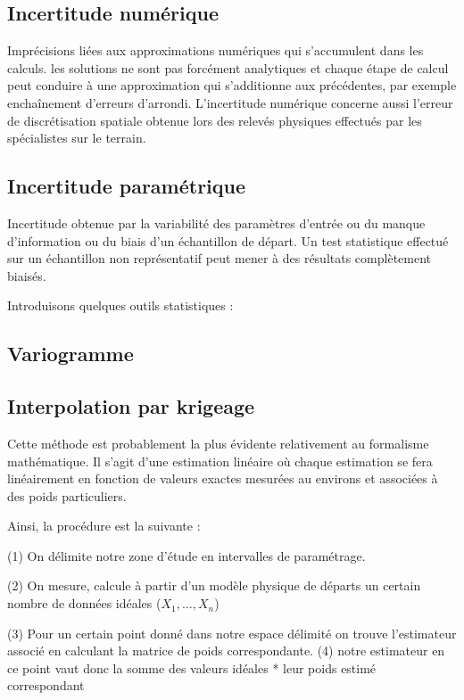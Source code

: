 \documentclass[hidelinks,12pt]{article}
\begin{document}
\subsection{Incertitude numérique}


Imprécisions liées aux approximations numériques qui s’accumulent dans les calculs. les solutions ne sont pas forcément analytiques et chaque étape de calcul peut conduire à une approximation qui s’additionne aux précédentes, par exemple enchaînement d’erreurs d’arrondi. L’incertitude numérique concerne aussi l’erreur de discrétisation spatiale obtenue lors des relevés physiques effectués par les spécialistes sur le terrain.

\subsection{Incertitude paramétrique}

Incertitude obtenue par la variabilité des paramètres d’entrée ou du manque d’information ou du biais d’un échantillon de départ. Un test statistique effectué sur un échantillon non représentatif peut mener à des résultats complètement biaisés.





Introduisons quelques outils statistiques :

\subsection{Variogramme}


\subsection{Interpolation par krigeage}

Cette méthode est probablement la plus évidente relativement au formalisme mathématique. Il s'agit d'une estimation linéaire où chaque estimation se fera linéairement en fonction de valeurs exactes mesurées au environs et associées à des poids particuliers.

Ainsi, la procédure est la suivante :

(1) On délimite notre zone d'étude en intervalles de paramétrage.

(2) On mesure, calcule à partir d'un modèle physique de départs un certain nombre de données idéales ($X_1,\ldots,X_n$)

(3) Pour un certain point donné dans notre espace délimité on trouve l'estimateur associé en calculant la matrice de poids correspondante.
(4) notre estimateur en ce point vaut donc la somme des valeurs idéales * leur poids estimé correspondant
\end{document}
